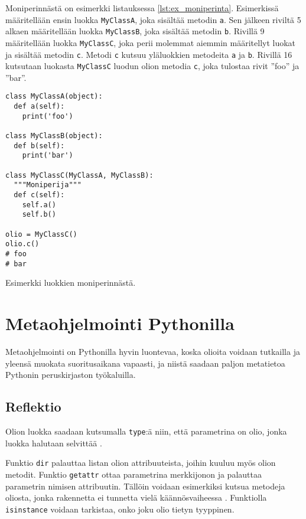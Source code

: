 \documentclass[finnish]{tktltiki2}
\theoremstyle{definition}
\theoremstyle{remark}
\begin{document}
Moniperinnästä on esimerkki listauksessa \ref{lst:ex_moniperinta}. Esimerkissä määritellään ensin luokka \verb|MyClassA|, joka sisältää metodin \verb|a|. Sen jälkeen riviltä 5 alkaen määritellään luokka \verb|MyClassB|, joka sisältää metodin \verb|b|. Rivillä 9 määritellään luokka \verb|MyClassC|, joka perii molemmat aiemmin määritellyt luokat ja sisältää metodin \verb|c|. Metodi \verb|c| kutsuu yläluokkien metodeita \verb|a| ja \verb|b|. Rivillä 16 kutsutaan luokasta \verb|MyClassC| luodun olion metodia \verb|c|, joka tulostaa rivit ''foo'' ja ''bar''.

\begin{listing}
\begin{verbatim}
class MyClassA(object):
  def a(self):
    print('foo')

class MyClassB(object):
  def b(self):
    print('bar')

class MyClassC(MyClassA, MyClassB):
  """Moniperija"""
  def c(self):
    self.a()
    self.b()

olio = MyClassC()
olio.c()
# foo    
# bar
\end{verbatim}
    \caption{Esimerkki luokkien moniperinnästä.}
    \label{lst:ex_moniperinta}
\end{listing}


\section{Metaohjelmointi Pythonilla}


Metaohjelmointi on Pythonilla hyvin luontevaa, koska olioita voidaan tutkailla ja yleensä muokata suoritusaikana vapaasti, ja niistä saadaan paljon metatietoa Pythonin peruskirjaston työkaluilla.


\subsection{Reflektio}



Olion luokka saadaan kutsumalla \verb|type|:ä niin, että parametrina on olio, jonka luokka halutaan selvittää \cite{dive-into-python}. 

Funktio \verb|dir| palauttaa listan olion attribuuteista, joihin kuuluu myös olion metodit. Funktio \verb|getattr| ottaa parametrina merkkijonon ja palauttaa parametrin nimisen attribuutin. Tällöin voidaan esimerkiksi kutsua metodeja oliosta, jonka rakennetta ei tunnetta vielä käännösvaiheessa \cite{dive-into-python}. Funktiolla \verb|isinstance| voidaan tarkistaa, onko joku olio tietyn tyyppinen. 
\end{document}
